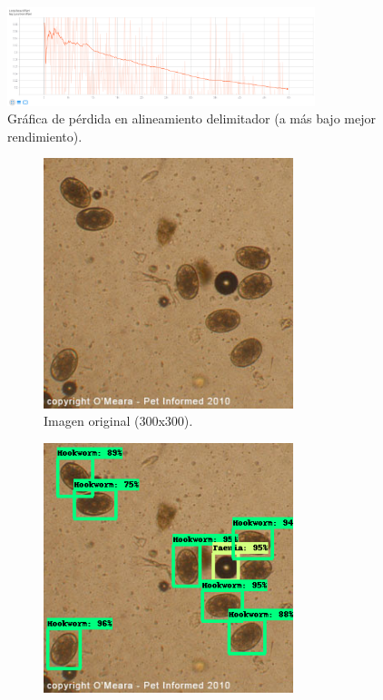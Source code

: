 \documentclass[letter,12pt]{report}
\begin{document}
\begin{figure}[ht]
    \centering
    \includegraphics[width=0.8\textwidth]{offset}
    \caption{Gráfica de pérdida en alineamiento delimitador (a más bajo mejor rendimiento).}
    \label{fig:offset}
\end{figure}

\begin{figure}[H]
    \begin{subfigure}{0.5\textwidth}
        \centering
        \includegraphics[width=0.8\textwidth]{caca}
        \caption{Imagen original (300x300).}
        \label{fig:caca}
    \end{subfigure}
    \begin{subfigure}{0.5\textwidth}
        \centering
        \includegraphics[width=0.8\textwidth]{cacafit}

\end{subfigure}
\end{figure}
\end{document}
